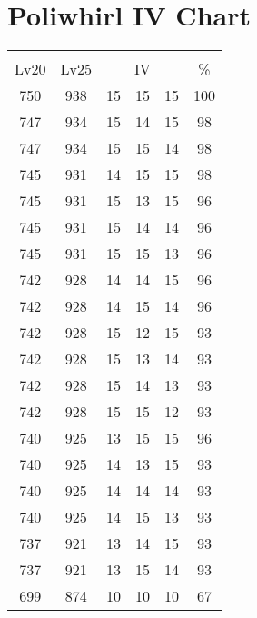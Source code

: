 \documentclass{article}%
\begin{document}
%
\normalsize%
\section{Poliwhirl IV Chart}%
\label{sec:Poliwhirl IV Chart}%
\renewcommand{\arraystretch}{1.5}%
\begin{tabular}{|c|c|c|c|c|c|}%
\hline%
\multicolumn{6}{|c|}{\textcolor{white}{ 
\linebreak{Poliwhirl}
}%
\cellcolor{black}}\\%
\multicolumn{1}{|c}{Lv20}&\multicolumn{1}{c|}{Lv25}&\multicolumn{3}{c|}{IV}&\multicolumn{1}{|c|}{\%}\\%
\hline%
\rowcolor{color100}%
750&938&15&15&15&100\\%
\hline%
\rowcolor{color98}%
747&934&15&14&15&98\\%
\hline%
\rowcolor{color98}%
747&934&15&15&14&98\\%
\hline%
\rowcolor{color98}%
745&931&14&15&15&98\\%
\hline%
\rowcolor{color96}%
745&931&15&13&15&96\\%
\hline%
\rowcolor{color96}%
745&931&15&14&14&96\\%
\hline%
\rowcolor{color96}%
745&931&15&15&13&96\\%
\hline%
\rowcolor{color96}%
742&928&14&14&15&96\\%
\hline%
\rowcolor{color96}%
742&928&14&15&14&96\\%
\hline%
\rowcolor{color93}%
742&928&15&12&15&93\\%
\hline%
\rowcolor{color93}%
742&928&15&13&14&93\\%
\hline%
\rowcolor{color93}%
742&928&15&14&13&93\\%
\hline%
\rowcolor{color93}%
742&928&15&15&12&93\\%
\hline%
\rowcolor{color96}%
740&925&13&15&15&96\\%
\hline%
\rowcolor{color93}%
740&925&14&13&15&93\\%
\hline%
\rowcolor{color93}%
740&925&14&14&14&93\\%
\hline%
\rowcolor{color93}%
740&925&14&15&13&93\\%
\hline%
\rowcolor{color93}%
737&921&13&14&15&93\\%
\hline%
\rowcolor{color93}%
737&921&13&15&14&93\\%
\hline%
\rowcolor{color91}%
699&874&10&10&10&67\\%
\end{tabular}

%
\end{document}
